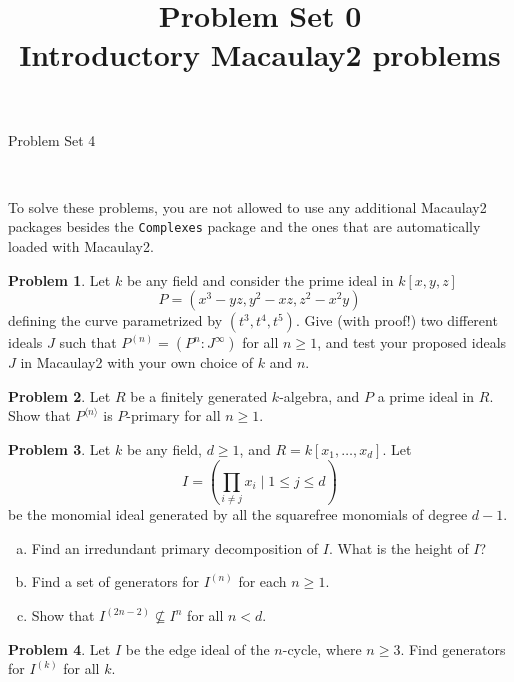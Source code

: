 \documentclass[11pt]{article}
\title{}
\date{\vspace{-0.5in}}
\title{Problem Set 0 \\ Introductory Macaulay2 problems}
\theoremstyle{definition}
\newtheorem{problem}{Problem}
\begin{document}
\thispagestyle{fancy}
\pagestyle{fancy}


\begin{center}
	{\LARGE Problem Set 4\\
	
	
}
\end{center}

\

To solve these problems, you are not allowed to use any additional Macaulay2 packages besides the \texttt{Complexes} package and the ones that are automatically loaded with Macaulay2.


\begin{problem}
	Let $k$ be any field and consider the prime ideal in $k[x,y,z]$
	$$P = (x^3-yz,y^2-xz,z^2-x^2y)$$
	defining the curve parametrized by $(t^3, t^4, t^5)$. Give (with proof!) two different ideals $J$ such that $P^{(n)} = (P^n : J^\infty)$ for all $n \geqslant 1$, and test your proposed ideals $J$ in Macaulay2 with your own choice of $k$ and $n$.
\end{problem}


\begin{problem}
	Let $R$ be a finitely generated $k$-algebra, and $P$ a prime ideal in $R$. Show that $P^{\langle n\rangle}$ is $P$-primary for all $n \geqslant 1$.
\end{problem}



\begin{problem}
	Let $k$ be any field, $d \geqslant 1$, and $R = k[x_1, \ldots, x_d]$. Let
	$$I = \left( \prod_{i \neq j} x_{i} \mid 1 \leqslant j \leqslant d \right)$$
	be the monomial ideal generated by all the squarefree monomials of degree $d-1$. 
	\begin{enumerate}[a)]
		\item Find an irredundant primary decomposition of $I$. What is the height of $I$?
		\item Find a set of generators for $I^{(n)}$ for each $n \geqslant 1$.
		\item Show that $I^{(2n-2)} \nsubseteq I^n$ for all $n < d$.
	\end{enumerate}
\end{problem}


\begin{problem}
	Let $I$ be the edge ideal of the $n$-cycle, where $n \geqslant 3$. Find generators for $I^{(k)}$ for all $k$.
\end{problem}
\end{document}
